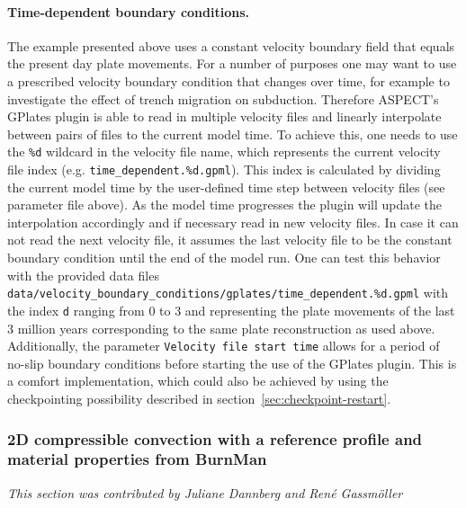 \documentclass{article}
\newcommand{\aspect}{\textsc{ASPECT}}
\begin{document}
\paragraph{Time-dependent boundary conditions.}
\label{sec:time-dependent-gplates-velocities}
The example presented above uses a constant velocity boundary field that
equals the present day plate movements. For a number of purposes one may want to
use a prescribed velocity boundary condition that changes over time, for example
to investigate the effect of trench migration on subduction. Therefore \aspect{}'s
GPlates plugin is able to read in multiple velocity files and linearly interpolate
between pairs of files to the current model time. To achieve this, one needs
to use the \texttt{\%d} wildcard in the velocity file name, which represents the current
velocity file index (e.g. \texttt{time\_dependent.\%d.gpml}). This index is
calculated by dividing the current model time by the user-defined time step
between velocity files (see parameter file above). As the model time progresses
the plugin will update the interpolation accordingly and if necessary read in
new velocity files. In case it can not read the next velocity file, it assumes
the last velocity file to be the constant boundary condition until the end of
the model run. One can test this behavior with the provided data files
\texttt{data/velocity\_boundary\_conditions/gplates/time\_dependent.\%d.gpml}
with the index \texttt{d} ranging from 0 to 3 and representing the plate movements of
the last 3 million years corresponding to the same plate reconstruction as used
above. Additionally, the parameter \texttt{Velocity file start time} allows for
a period of no-slip boundary conditions before starting the use of the GPlates plugin.
This is a comfort implementation, which could also be achieved by using the checkpointing
possibility described in section~\ref{sec:checkpoint-restart}. 

\subsubsection{2D compressible convection with a reference profile and material properties from BurnMan}
\label{sec:cookbooks-burnman}
\textit{This section was contributed by Juliane Dannberg and Ren{\'e} Gassm{\"o}ller}
\end{document}
